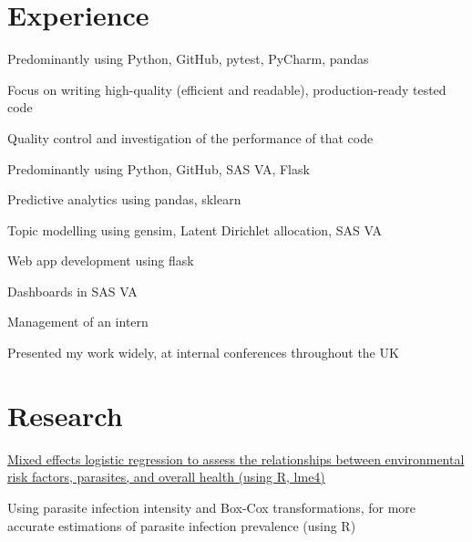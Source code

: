 \documentclass[]{cv-template}
\begin{document}
\begin{minipage}[t]{0.66\textwidth} 


\section{Experience}
\vspace{\topsep} %
\begin{tightemize}
\item Predominantly using Python, GitHub, pytest, PyCharm, pandas
\item Focus on writing high-quality (efficient and readable), production-ready tested code
\item Quality control and investigation of the performance of that code
\end{tightemize}

\sectionsep

\begin{tightemize}
\item Predominantly using Python, GitHub, SAS VA, Flask
\item Predictive analytics using pandas, sklearn
\item Topic modelling using gensim, Latent Dirichlet allocation, SAS VA
\item Web app development using flask
\item Dashboards in SAS VA
\item Management of an intern
\item Presented my work widely, at internal conferences throughout the UK
\end{tightemize}
\sectionsep


\section{Research}
\begin{tightemize}
\item {\href{https://journals.plos.org/plosntds/article?id=10.1371/journal.pntd.0005948}{Mixed effects logistic regression to assess the relationships between environmental risk factors, parasites, and overall health (using R, lme4)}}
\item Using parasite infection intensity and Box-Cox transformations, for more accurate estimations of parasite infection prevalence (using R)
\end{tightemize}
\sectionsep



\end{minipage}
\end{document}
